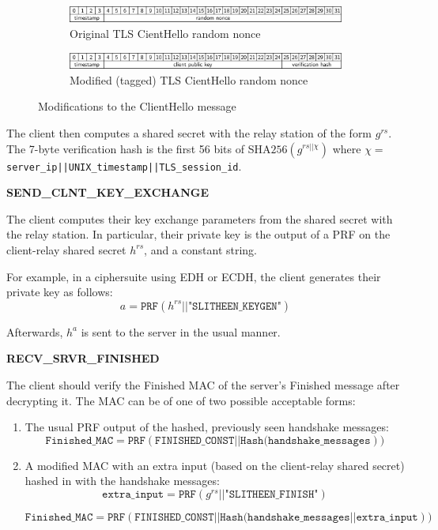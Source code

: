 \documentclass[11pt]{article}
\theoremstyle{definittion}
\begin{document}
\begin{figure}[h]
\begin{subfigure}{\textwidth}
\centering
\includegraphics{old_client_hello}
\caption{Original TLS CientHello random nonce}

\end{subfigure}

\vspace{5mm}
\begin{subfigure}{\textwidth}
\centering
\includegraphics{new_client_hello}
\caption{Modified (tagged) TLS CientHello random nonce}

\end{subfigure}
\caption{Modifications to the ClientHello message}
\end{figure}

The client then computes a shared secret with the relay station of the form $g^{rs}$. The 7-byte verification hash is the first 56 bits of SHA$256(g^{rs||\chi})$ where $\chi = $ \texttt{server\_ip||UNIX\_timestamp||TLS\_session\_id}.

\textbf{SEND\_CLNT\_KEY\_EXCHANGE}

The client computes their key exchange parameters from the shared secret with the relay station. In particular, their private key is the output of a PRF on the client-relay shared secret $h^{rs}$, and a constant string.

For example, in a ciphersuite using EDH or ECDH, the client generates their private key as follows:
$$a = \texttt{PRF}(h^{rs} || \texttt{"SLITHEEN\_KEYGEN"})$$

Afterwards, $h^a$ is sent to the server in the usual manner.

\textbf{RECV\_SRVR\_FINISHED}

The client should verify the Finished MAC of the server's Finished message after decrypting it. The MAC can be of one of two possible acceptable forms:
\begin{enumerate}
\item The usual PRF output of the hashed, previously seen handshake messages:
$$\texttt{Finished\_MAC} = \texttt{PRF}(\texttt{FINISHED\_CONST}||\texttt{Hash(handshake\_messages}))$$
\item A modified MAC with an extra input (based on the client-relay shared secret) hashed in with the handshake messages:
$$\texttt{extra\_input} = \texttt{PRF}(g^{rs} || \texttt{"SLITHEEN\_FINISH"})$$

$$\texttt{Finished\_MAC} = \texttt{PRF}(\texttt{FINISHED\_CONST}||\texttt{Hash(handshake\_messages} || \texttt{extra\_input}))$$

\end{enumerate}
\end{document}
